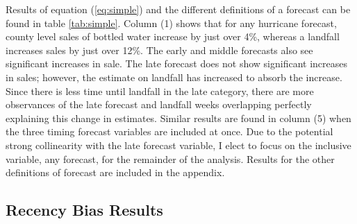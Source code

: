 \documentclass{article}
\begin{document}
Results of equation (\ref{eq:simple}) and the different definitions of a forecast can be found in table \ref{tab:simple}.  Column (1) shows that for any hurricane forecast, county level sales of bottled water increase by just over 4\%,  whereas a landfall increases sales by just over 12\%. The early and middle forecasts also see significant increases in sale. The late forecast does not show significant increases in sales; however, the estimate on landfall has increased to absorb the increase. Since there is less time until landfall in the late category, there are more observances of the late forecast and landfall weeks overlapping perfectly explaining this change in estimates. Similar results are found in column (5) when the three timing forecast variables are included at once. Due to the potential strong collinearity with the late forecast variable, I elect to focus on the inclusive variable, any forecast, for the remainder of the analysis. Results for the other definitions of forecast are included in the appendix. 

\subsection{Recency Bias Results}
\end{document}
